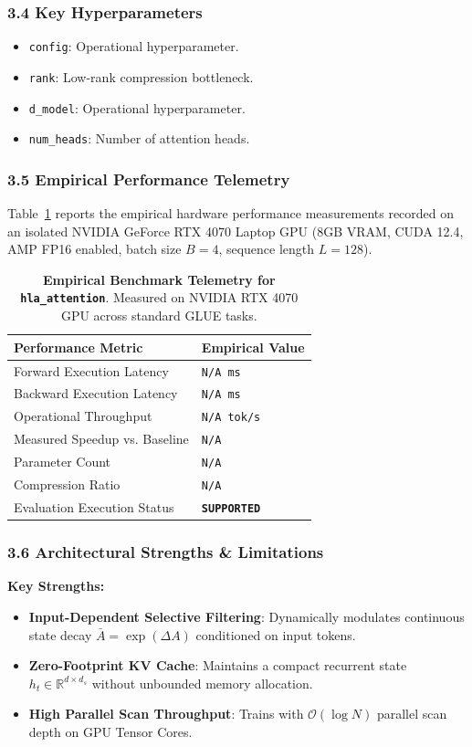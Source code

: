 \subsubsection*{3.4 Key Hyperparameters}
\begin{itemize}
    \item \texttt{config}: Operational hyperparameter.
    \item \texttt{rank}: Low-rank compression bottleneck.
    \item \texttt{d\_model}: Operational hyperparameter.
    \item \texttt{num\_heads}: Number of attention heads.
\end{itemize}

\subsubsection*{3.5 Empirical Performance Telemetry}
Table~\ref{tab:telemetry_hla\_attention} reports the empirical hardware performance measurements recorded on an isolated NVIDIA GeForce RTX 4070 Laptop GPU (8GB VRAM, CUDA 12.4, AMP FP16 enabled, batch size $B=4$, sequence length $L=128$).

\begin{table}[h]
\centering
\small
\caption{\textbf{Empirical Benchmark Telemetry for \texttt{hla\_attention}}. Measured on NVIDIA RTX 4070 GPU across standard GLUE tasks.}
\label{tab:telemetry_hla\_attention}
\begin{tabularx}{\columnwidth}{lX}
\toprule
\textbf{Performance Metric} & \textbf{Empirical Value} \\
\midrule
Forward Execution Latency & \texttt{N/A ms} \\
Backward Execution Latency & \texttt{N/A ms} \\
Operational Throughput & \texttt{N/A tok/s} \\
Measured Speedup vs. Baseline & \texttt{N/A} \\
Parameter Count & \texttt{N/A} \\
Compression Ratio & \texttt{N/A} \\
Evaluation Execution Status & \textbf{\texttt{SUPPORTED}} \\
\bottomrule
\end{tabularx}
\end{table}

\subsubsection*{3.6 Architectural Strengths \& Limitations}
\textbf{Key Strengths:}
\begin{itemize}
    \item \textbf{Input-Dependent Selective Filtering}: Dynamically modulates continuous state decay $\bar{A} = \exp(\Delta A)$ conditioned on input tokens.
    \item \textbf{Zero-Footprint KV Cache}: Maintains a compact recurrent state $h_t \in \mathbb{R}^{d \times d_s}$ without unbounded memory allocation.
    \item \textbf{High Parallel Scan Throughput}: Trains with $\mathcal{O}(\log N)$ parallel scan depth on GPU Tensor Cores.
\end{itemize}

